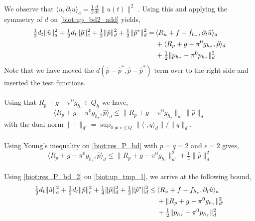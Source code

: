 \\
We observe that $\langle u, \partial_t u \rangle_a = \tfrac{1}{2}\tfrac{d}{dt} \|u(t)\|^2$ \cite{ern}. Using this and applying the symmetry of $d$ on \eqref{biot:up_bd2_add} yields,
\\
\begin{align} \label{biot:up_tmp_1}
\tfrac{1}{2} d_t \|\hat{u}\|_a^2 + \tfrac{1}{2} d_t \|\hat{p}\|_c^2 + \tfrac{1}{2} \|\hat{p}\|_d^2 + \tfrac{1}{2} \|\hat{p}^*\|_d^2 = & \, \langle R_u + f - f_{h_\tau}, \partial_t \hat{u} \rangle_a \\
& \, + \langle R_p + g - \pi^0g_{h_\tau}, \hat{p} \rangle_d \notag\\
& \, + \tfrac{1}{2} \|p_{h_\tau} - \pi^0p_{h_\tau}\|_d^2 \notag 
\end{align}
Note that we have moved the $d(\hat{p}-\hat{p}^*, \hat{p}-\hat{p}^*)$ term over to the right side and inserted the test functions. 
\\
\\
Using that $R_p + g - \pi^0g_{h_\tau} \in Q_h$ we have, 
\begin{equation} \label{biot:res_P_bd}
\langle R_p + g - \pi^0g_{h_\tau}, \hat{p} \rangle_d 
 \leq \| R_p + g - \pi^0g_{h_\tau} \|_{d'} \| \hat{p} \|_d
\end{equation}
with the dual norm  $\|\cdot\|_{d'} = \sup_{0 \neq v \in Q} \|\langle \cdot, q \rangle_d\| / \|q\|_d$.
\\
\\
Using Young's inequality on \eqref{biot:res_P_bd} with $p=q=2$ and $\epsilon=2$ gives,
\begin{equation}\label{biot:res_P_bd_2}
\langle R_p + g - \pi^0g_{h_\tau}, \hat{p} \rangle_d \leq \| R_p + g - \pi^0g_{h_\tau} \|^2_{d'} + \tfrac{1}{4} \|\hat{p} \|^2_d
\end{equation}
\\
Using \eqref{biot:res_P_bd_2} on \eqref{biot:up_tmp_1}, we arrive at the following bound,
\\
\begin{align}\label{biot:up_bd_tmp}
\tfrac{1}{2} d_t \|\hat{u}\|_a^2 + \tfrac{1}{2} d_t \|\hat{p}\|_c^2 + \tfrac{1}{4}\|\hat{p}\|_d^2 + \tfrac{1}{2} \|\hat{p}^*\|_d^2 \leq & \, \langle R_u + f - f_{h_\tau}, \partial_t \hat{u} \rangle_a  \\
 & \, + \|R_p + g - \pi^0g_{h_\tau}\|_{d'}^2 \notag \\
 & \, + \tfrac{1}{2} \|p_{h_\tau} - \pi^0p_{h_\tau}\|_d^2 \notag
\end{align}
\\
